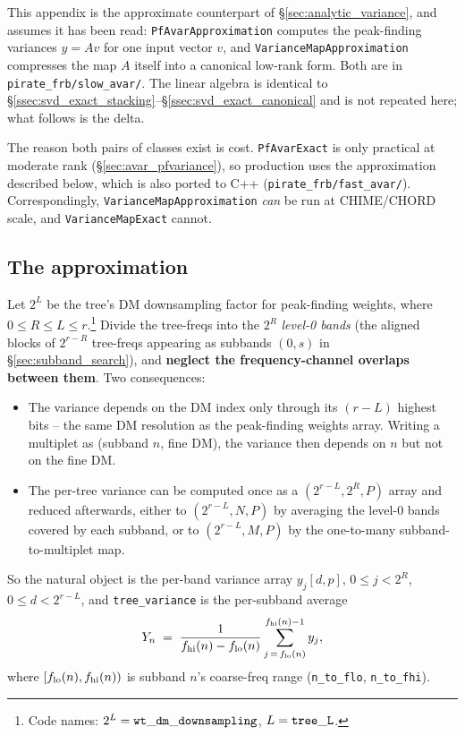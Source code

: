 \documentclass{article}
\numberwithin{equation}{section}   %
\begin{document}
This appendix is the approximate counterpart of \S\ref{sec:analytic_variance}, and assumes it
has been read: {\tt PfAvarApproximation} computes the peak-finding variances $y = Av$ for one
input vector $v$, and {\tt VarianceMapApproximation} compresses the map $A$ itself into a
canonical low-rank form. Both are in \verb|pirate_frb/slow_avar/|. The linear algebra is
identical to \S\ref{ssec:svd_exact_stacking}--\S\ref{ssec:svd_exact_canonical} and is not
repeated here; what follows is the delta.

The reason both pairs of classes exist is cost. {\tt PfAvarExact} is only practical at moderate
rank (\S\ref{sec:avar_pfvariance}), so production uses the approximation described below, which
is also ported to C++ (\verb|pirate_frb/fast_avar/|). Correspondingly,
{\tt VarianceMapApproximation} {\em can} be run at CHIME/CHORD scale, and
{\tt VarianceMapExact} cannot.

\subsection{The approximation}
\label{ssec:approx_def}

Let $2^L$ be the tree's DM downsampling factor for peak-finding weights, where
$0 \le R \le L \le r$.\footnote{Code names: $2^L = {\tt wt\_dm\_downsampling}$,
$L = {\tt tree\_L}$.} Divide the tree-freqs into the $2^R$ {\em level-0 bands} (the aligned
blocks of $2^{r-R}$ tree-freqs appearing as subbands $(0,s)$ in \S\ref{sec:subband_search}), and
{\bf neglect the frequency-channel overlaps between them}. Two consequences:
\begin{itemize}
\item The variance depends on the DM index only through its $(r-L)$ highest bits -- the same DM
resolution as the peak-finding weights array. Writing a multiplet as (subband $n$, fine DM), the
variance then depends on $n$ but not on the fine DM.
\item The per-tree variance can be computed once as a $(2^{r-L}, 2^R, P)$ array and reduced
afterwards, either to $(2^{r-L}, N, P)$ by averaging the level-0 bands covered by each subband,
or to $(2^{r-L}, M, P)$ by the one-to-many subband-to-multiplet map.
\end{itemize}
So the natural object is the per-band variance array $y_j[d,p]$, $0 \le j < 2^R$,
$0 \le d < 2^{r-L}$, and {\tt tree\_variance} is the per-subband average
\begin{equation}
Y_n \;=\; \frac{1}{f_{\rm hi}(n) - f_{\rm lo}(n)} \sum_{j\,=\,f_{\rm lo}(n)}^{f_{\rm hi}(n)-1} y_j ,
\label{eq:approx_subband_avg}
\end{equation}
where $[f_{\rm lo}(n), f_{\rm hi}(n))$ is subband $n$'s coarse-freq range
({\tt n\_to\_flo}, {\tt n\_to\_fhi}).
\end{document}
